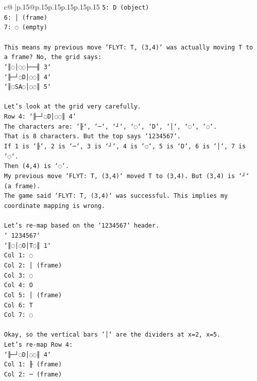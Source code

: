 \documentclass{article}
\begin{document}
{\begin{supertabular}{c@{$\;$}|p{.15\linewidth}@{}p{.15\linewidth}p{.15\linewidth}p{.15\linewidth}p{.15\linewidth}p{.15\linewidth}}
{{{\texttt{5: D (object)} \\
\texttt{6: │ (frame)} \\
\texttt{7: ◌ (empty)} \\
\\ 
\texttt{This means my previous move `FLYT: T, (3,4)` was actually moving T to a frame? No, the grid says:} \\
\texttt{`║◌│◌◌├──╢ 3`} \\
\texttt{`╟─┘◌D│◌◌║ 4`} \\
\texttt{`║◌SA◌│◌◌║ 5`} \\
\\ 
\texttt{Let's look at the grid very carefully.} \\
\texttt{Row 4: `╟─┘◌D│◌◌║ 4`} \\
\texttt{The characters are: `╟`, `─`, `┘`, `◌`, `D`, `│`, `◌`, `◌`.} \\
\texttt{That is 8 characters. But the top says `1234567`.} \\
\texttt{If 1 is `╟`, 2 is `─`, 3 is `┘`, 4 is `◌`, 5 is `D`, 6 is `│`, 7 is `◌`.} \\
\texttt{Then (4,4) is `◌`.} \\
\texttt{My previous move `FLYT: T, (3,4)` moved T to (3,4). But (3,4) is `┘` (a frame).} \\
\texttt{The game said `FLYT: T, (3,4)` was successful. This implies my coordinate mapping is wrong.} \\
\\ 
\texttt{Let's re{-}map based on the `1234567` header.} \\
\texttt{` 1234567`} \\
\texttt{`║◌│◌O│T◌║ 1`} \\
\texttt{Col 1: ◌} \\
\texttt{Col 2: │ (frame)} \\
\texttt{Col 3: ◌} \\
\texttt{Col 4: O} \\
\texttt{Col 5: │ (frame)} \\
\texttt{Col 6: T} \\
\texttt{Col 7: ◌} \\
\\ 
\texttt{Okay, so the vertical bars `│` are the dividers at x=2, x=5.} \\
\texttt{Let's re{-}map Row 4:} \\
\texttt{`╟─┘◌D│◌◌║ 4`} \\
\texttt{Col 1: ╟ (frame)} \\
\texttt{Col 2: ─ (frame)} \\
}}}
\end{supertabular}}
\end{document}
